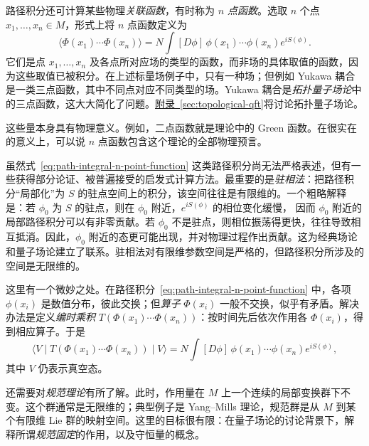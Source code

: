 路径积分还可计算某些物理\emph{关联函数}，有时称为 \emph{$n$ 点函数}。选取 $n$ 个点 $x_1,\ldots,x_n\in M$，形式上将 $n$ 点函数定义为
\begin{equation}\label{eq:path-integral-n-point-function}
\langle\Phi(x_1)\cdots\Phi(x_n)\rangle
=N\int[D\phi]\,\phi(x_1)\cdots\phi(x_n)e^{iS(\phi)}.
\end{equation}
它们是点 $x_1,\ldots,x_n$ 及各点所对应场的类型的函数，而非场的具体取值的函数，因为这些取值已被积分。在上述标量场例子中，只有一种场；但例如 Yukawa 耦合是一类三点函数，其中不同点对应不同类型的场。Yukawa 耦合是\emph{拓扑量子场论}中的三点函数，这大大简化了问题。\hyperref[sec:topological-qft]{附录~\ref*{sec:topological-qft}}将讨论拓扑量子场论。

这些量本身具有物理意义。例如，二点函数就是理论中的 Green 函数。在很实在的意义上，可以说 $n$ 点函数包含这个理论的全部物理预言。

虽然式~\eqref{eq:path-integral-n-point-function} 这类路径积分尚无法严格表述，但有一些获得部分论证、被普遍接受的启发式计算方法。最重要的是\emph{驻相法}：把路径积分“局部化”为 $S$ 的驻点空间上的积分，该空间往往是有限维的。一个粗略解释是：若 $\phi_0$ 为 $S$ 的驻点，则在 $\phi_0$ 附近，$e^{iS(\phi)}$ 的相位变化缓慢，
因而 $\phi_0$ 附近的局部路径积分可以有非零贡献。若 $\phi_0$ 不是驻点，则相位振荡得更快，往往导致相互抵消。因此，$\phi_0$ 附近的态更可能出现，并对物理过程作出贡献。这为经典场论和量子场论建立了联系。驻相法对有限维参数空间是严格的，但路径积分所涉及的空间是无限维的。

这里有一个微妙之处。在路径积分~\eqref{eq:path-integral-n-point-function} 中，各项 $\phi(x_i)$ 是数值分布，彼此交换；但\emph{算子} $\Phi(x_i)$ 一般不交换，似乎有矛盾。解决办法是定义\emph{编时乘积} $T(\Phi(x_1)\cdots\Phi(x_n))$：按时间先后依次作用各 $\Phi(x_i)$，得到相应算子。于是
\[
\langle V\mid T(\Phi(x_1)\cdots\Phi(x_n))\mid V\rangle
=N\int[D\phi]\,\phi(x_1)\cdots\phi(x_n)e^{iS(\phi)},
\]
其中 $V$ 仍表示真空态。

还需要对\emph{规范理论}有所了解。此时，作用量在 $M$ 上一个连续的局部变换群下不变。这个群通常是无限维的；典型例子是 Yang--Mills 理论，规范群是从 $M$ 到某个有限维 Lie 群的映射空间。这里的目标很有限：在量子场论的讨论背景下，解释所谓\emph{规范固定}的作用，以及守恒量的概念。


